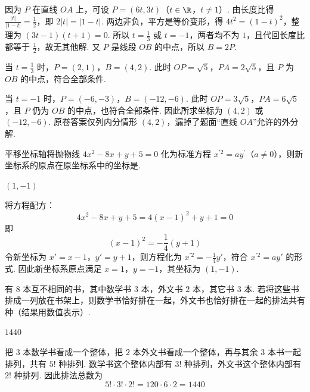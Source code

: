 \documentclass[UTF8,a4paper,oneside,11pt]{ctexbook}
\begin{document}
\begin{solution}
因为 \(P\) 在直线 \(OA\) 上，可设 \(P=(6t,3t)\)（\(t\in\R\)，\(t\neq1\)）. 由长度比得 \(\frac{|t|}{|1-t|}=\frac12\)，即 \(2|t|=|1-t|\). 两边非负，平方是等价变形，得 \(4t^2=(1-t)^2\)，整理为 \((3t-1)(t+1)=0\). 所以 \(t=\frac13\) 或 \(t=-1\)，两者均不为 \(1\)，且代回长度比都等于 \(\frac12\)，故无其他解. 又 \(P\) 是线段 \(OB\) 的中点，所以 \(B=2P\).

当 \(t=\frac13\) 时，\(P=(2,1)\)，\(B=(4,2)\). 此时 \(OP=\sqrt5\)，\(PA=2\sqrt5\)，且 \(P\) 为 \(OB\) 的中点，符合全部条件.

当 \(t=-1\) 时，\(P=(-6,-3)\)，\(B=(-12,-6)\). 此时 \(OP=3\sqrt5\)，\(PA=6\sqrt5\)，且 \(P\) 仍为 \(OB\) 的中点，也符合全部条件. 因此所求坐标为 \((4,2)\) 或 \((-12,-6)\). 原卷答案仅列内分情形 \((4,2)\)，漏掉了题面“直线 \(OA\)”允许的外分解.
\end{solution}

\begin{problem}[A]
平移坐标轴将抛物线 \(4x^2-8x+y+5=0\) 化为标准方程 \(x^{\prime2}=ay^\prime\)（\(a\neq0\)），则新坐标系的原点在原坐标系中的坐标是\fillinblank{}.
\end{problem}

\begin{answer}
\((1,-1)\)
\end{answer}

\begin{solution}
将方程配方：
\[
4x^2-8x+y+5=4(x-1)^2+y+1=0
\]
即
\[
(x-1)^2=-\frac{1}{4}(y+1)
\]
令新坐标为 \(x'=x-1\)，\(y'=y+1\)，则方程化为
\(x^{\prime2}=-\frac{1}{4}y'\)，符合 \(x^{\prime2}=ay'\) 的形式. 因此新坐标系原点满足
\(x=1\)，\(y=-1\)，其坐标为 \((1,-1)\).
\end{solution}

\begin{problem}[A]
有 \(8\) 本互不相同的书，其中数学书 \(3\) 本，外文书 \(2\) 本，其它书 \(3\) 本. 若将这些书排成一列放在书架上，则数学书恰好排在一起，外文书也恰好排在一起的排法共有\fillinblank{}种（结果用数值表示）.
\end{problem}

\begin{answer}
\(1440\)
\end{answer}

\begin{solution}
把 \(3\) 本数学书看成一个整体，把 \(2\) 本外文书看成一个整体，再与其余 \(3\) 本书一起排列，共有 \(5!\) 种排列. 数学书这个整体内部有 \(3!\) 种排列，外文书这个整体内部有 \(2!\) 种排列. 因此排法总数为
\[
5!\cdot3!\cdot2!=120\cdot6\cdot2=1440
\]
\end{solution}
\end{document}
